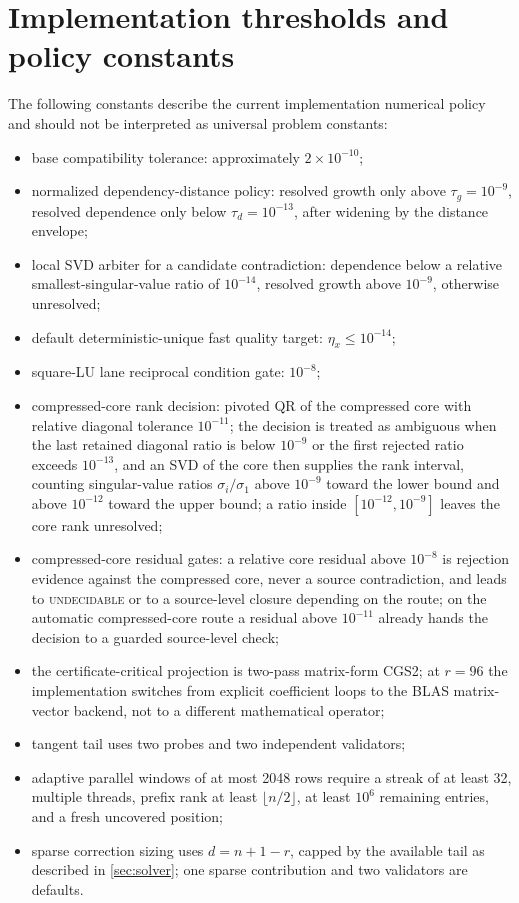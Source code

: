 \documentclass[11pt]{article}
\theoremstyle{definition}
\begin{document}
\section{Implementation thresholds and policy constants}\label{app:thresholds}
The following constants describe the current implementation numerical policy and should not be interpreted as universal problem constants:
\begin{itemize}
\item base compatibility tolerance: approximately $2\times10^{-10}$;
\item normalized dependency-distance policy: resolved growth only above $\tau_g=10^{-9}$, resolved dependence only below $\tau_d=10^{-13}$, after widening by the distance envelope;
\item local SVD arbiter for a candidate contradiction: dependence below a relative smallest-singular-value ratio of $10^{-14}$, resolved growth above $10^{-9}$, otherwise unresolved;
\item default deterministic-unique fast quality target: $\eta_x\le10^{-14}$;
\item square-LU lane reciprocal condition gate: $10^{-8}$;
\item compressed-core rank decision: pivoted QR of the compressed core with relative diagonal tolerance $10^{-11}$; the decision is treated as ambiguous when the last retained diagonal ratio is below $10^{-9}$ or the first rejected ratio exceeds $10^{-13}$, and an SVD of the core then supplies the rank interval, counting singular-value ratios $\sigma_i/\sigma_1$ above $10^{-9}$ toward the lower bound and above $10^{-12}$ toward the upper bound; a ratio inside $[10^{-12},10^{-9}]$ leaves the core rank unresolved;
\item compressed-core residual gates: a relative core residual above $10^{-8}$ is rejection evidence against the compressed core, never a source contradiction, and leads to \textsc{undecidable} or to a source-level closure depending on the route; on the automatic compressed-core route a residual above $10^{-11}$ already hands the decision to a guarded source-level check;
\item the certificate-critical projection is two-pass matrix-form CGS2; at $r=96$ the implementation switches from explicit coefficient loops to the BLAS matrix-vector backend, not to a different mathematical operator;
\item tangent tail uses two probes and two independent validators;
\item adaptive parallel windows of at most 2048 rows require a streak of at least 32, multiple threads, prefix rank at least $\lfloor n/2\rfloor$, at least $10^6$ remaining entries, and a fresh uncovered position;
\item sparse correction sizing uses $d=n+1-r$, capped by the available tail as described in \cref{sec:solver}; one sparse contribution and two validators are defaults.
\end{itemize}
\end{document}
